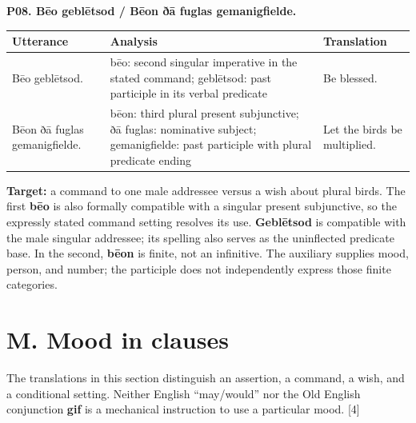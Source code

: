 \par\begin{minipage}{\linewidth}\raggedright
\textbf{P08. Bēo geblētsod /\allowbreak{} Bēon ðā fuglas gemanigfielde.}

\par\begingroup
\fontsize{10.5}{13.2}\selectfont
\setlength{\LTleft}{0pt}\setlength{\LTright}{\fill}
\noindent
\begin{tabular}{@{}>{\raggedright\arraybackslash}p{23.53mm}>{\raggedright\arraybackslash}p{73.7mm}>{\raggedright\arraybackslash}p{21.15mm}@{}}
\toprule
\textbf{Utterance} & \textbf{Analysis} & \textbf{Translation} \\
\midrule
Bēo geblētsod. & bēo: second singular imperative in the stated command; geblētsod: past participle in its verbal predicate & Be blessed. \\
Bēon ðā fuglas gemanigfielde. & bēon: third plural present subjunctive; ðā fuglas: nominative subject; gemanigfielde: past participle with plural predicate ending & Let the birds be multiplied. \\
\bottomrule
\end{tabular}
\par\endgroup

\textbf{Target:} a command to one male addressee versus a wish about plural birds. The first \textbf{bēo} is also formally compatible with a singular present subjunctive, so the expressly stated command setting resolves its use. \textbf{Geblētsod} is compatible with the male singular addressee; its spelling also serves as the uninflected predicate base. In the second, \textbf{bēon} is finite, not an infinitive. The auxiliary supplies mood, person, and number; the participle does not independently express those finite categories.

\end{minipage}\par\addvspace{4pt}

\section*{M. Mood in clauses}

The translations in this section distinguish an assertion, a command, a wish, and a conditional setting. Neither English “may/\allowbreak{}would” nor the Old English conjunction \textbf{gif} is a mechanical instruction to use a particular mood. [4]


